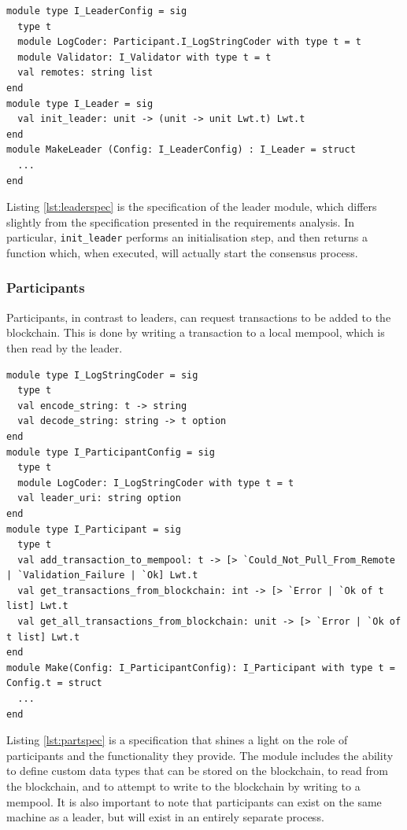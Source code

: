 \documentclass[12pt,a4paper,twoside,openright]{report}
\begin{document}
	\begin{lstlisting}[caption={Leader Specification},label={lst:leaderspec}]
module type I_LeaderConfig = sig
  type t
  module LogCoder: Participant.I_LogStringCoder with type t = t   
  module Validator: I_Validator with type t = t 
  val remotes: string list
end
module type I_Leader = sig
  val init_leader: unit -> (unit -> unit Lwt.t) Lwt.t
end
module MakeLeader (Config: I_LeaderConfig) : I_Leader = struct
  ...
end
	\end{lstlisting}

	Listing \ref{lst:leaderspec} is the specification of the leader module, which differs slightly from the specification presented in the requirements analysis.
	In particular, \texttt{init\_leader} performs an initialisation step, and then returns a function which, when executed, will actually start the consensus process.

	\subsubsection*{Participants}
	Participants, in contrast to leaders, can request transactions to be added to the blockchain. 
	This is done by writing a transaction to a local mempool, which is then read by the leader.\\

	\begin{lstlisting}[caption={Participant Specification},label={lst:partspec}]
module type I_LogStringCoder = sig
  type t
  val encode_string: t -> string
  val decode_string: string -> t option
end
module type I_ParticipantConfig = sig
  type t
  module LogCoder: I_LogStringCoder with type t = t
  val leader_uri: string option
end
module type I_Participant = sig
  type t
  val add_transaction_to_mempool: t -> [> `Could_Not_Pull_From_Remote | `Validation_Failure | `Ok] Lwt.t
  val get_transactions_from_blockchain: int -> [> `Error | `Ok of t list] Lwt.t
  val get_all_transactions_from_blockchain: unit -> [> `Error | `Ok of t list] Lwt.t
end
module Make(Config: I_ParticipantConfig): I_Participant with type t = Config.t = struct
  ...
end
	\end{lstlisting}

	Listing \ref{lst:partspec} is a specification that shines a light on the role of participants and the functionality they provide.
	The module includes the ability to define custom data types that can be stored on the blockchain, to read from the blockchain, and to attempt to write to the blockchain by writing to a mempool.
	It is also important to note that participants can exist on the same machine as a leader, but will exist in an entirely separate process.
\end{document}

